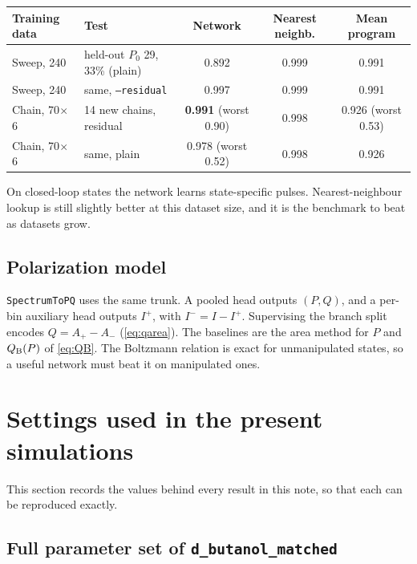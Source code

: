 \documentclass[11pt]{article}
\newcommand{\Iplus}{I^{+}}
\newcommand{\Iminus}{I^{-}}
\newcommand{\code}[1]{\texttt{#1}}
\begin{document}
\begin{center}
{\small\setlength{\tabcolsep}{4pt}
\begin{tabular}{llccc}
\toprule
Training data & Test & Network & Nearest neighb. & Mean program\\
\midrule
Sweep, 240 & held-out \(P_0\) 29, 33\% (plain) & 0.892 & 0.999 & 0.991\\
Sweep, 240 & same, \code{--residual} & 0.997 & 0.999 & 0.991\\
Chain, 70\(\times\)6 & 14 new chains, residual & \textbf{0.991} (worst 0.90) & 0.998 & 0.926 (worst 0.53)\\
Chain, 70\(\times\)6 & same, plain & 0.978 (worst 0.52) & 0.998 & 0.926\\
\bottomrule
\end{tabular}}
\end{center}

\noindent On closed-loop states the network learns state-specific pulses. Nearest-neighbour
lookup is still slightly better at this dataset size, and it is the benchmark to beat as datasets
grow.

\subsection{Polarization model}

\code{SpectrumToPQ} uses the same trunk. A pooled head outputs \((P,Q)\), and a per-bin auxiliary
head outputs \(\Iplus\), with \(\Iminus=I-\Iplus\). Supervising the branch split encodes
\(Q=A_+-A_-\) (\cref{eq:qarea}). The baselines are the area method for \(P\) and \(Q_{\rm B}(P)\)
of \cref{eq:QB}. The Boltzmann relation is exact for unmanipulated states, so a useful network
must beat it on manipulated ones.

\section{Settings used in the present simulations}
\label{sec:settings}

This section records the values behind every result in this note, so that each can be
reproduced exactly.

\subsection{Full parameter set of \texttt{d\_butanol\_matched}}
\end{document}

